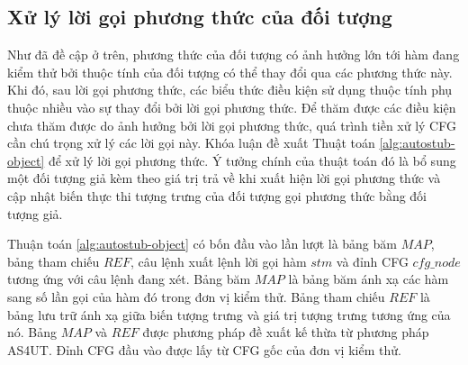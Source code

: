 \subsection{Xử lý lời gọi phương thức của đối tượng} \label{sec:autostub-obj}
Như đã đề cập ở trên, phương thức của đối tượng có ảnh hưởng lớn tới hàm đang kiểm thử bởi thuộc tính của đối tượng có thể thay đổi qua các phương thức này. Khi đó, sau lời gọi phương thức, các biểu thức điều kiện sử dụng thuộc tính phụ thuộc nhiều vào sự thay đổi bởi lời gọi phương thức. Để thăm được các điều kiện chưa thăm được do ảnh hưởng bởi lời gọi phương thức, quá trình tiền xử lý CFG cần chú trọng xử lý các lời gọi này. Khóa luận đề xuất Thuật toán \autoref{alg:autostub-object} để xử lý lời gọi phương thức. Ý tưởng chính của thuật toán đó là bổ sung một đối tượng giả kèm theo giá trị trả về khi xuất hiện lời gọi phương thức và cập nhật biến thực thi tượng trưng của đối tượng gọi phương thức bằng đối tượng giả. 

Thuận toán \autoref{alg:autostub-object} có bốn đầu vào lần lượt là bảng băm $MAP$, bảng tham chiếu $REF$, câu lệnh xuất lệnh lời gọi hàm $stm$ và đỉnh CFG $cfg\_node$ tương ứng với câu lệnh đang xét. Bảng băm $MAP$ là bảng băm ánh xạ các hàm sang số lần gọi của hàm đó trong đơn vị kiểm thử. Bảng tham chiếu $REF$ là bảng lưu trữ ánh xạ giữa biến tượng trưng và giá trị tượng trưng tương ứng của nó. Bảng $MAP$ và $REF$ được phương pháp đề xuất kế thừa từ phương pháp AS4UT. Đỉnh CFG đầu vào được lấy từ CFG gốc của đơn vị kiểm thử. 

